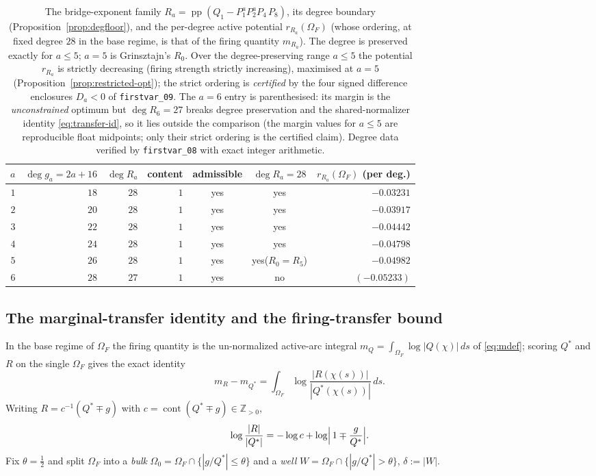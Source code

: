 \documentclass[11pt,reqno]{amsart}
\theoremstyle{plain}
\theoremstyle{definition}
\theoremstyle{remark}
\newcommand{\Z}{\mathbb{Z}}
\DeclareMathOperator{\pp}{pp}
\newcommand{\rb}[1]{r_{#1}}   %
\begin{document}
\begin{table}[ht]
\centering\small
\renewcommand{\arraystretch}{1.2}
\begin{tabular}{@{}rrrrccr@{}}
\toprule
$a$ & $\deg g_a=2a+16$ & $\deg R_a$ & content & admissible & $\deg R_a=28$ & $\rb{R_a}(\Omega_F)$ (per deg.)\\
\midrule
$1$ & $18$ & $28$ & $1$ & yes & yes & $-0.03231$\\
$2$ & $20$ & $28$ & $1$ & yes & yes & $-0.03917$\\
$3$ & $22$ & $28$ & $1$ & yes & yes & $-0.04442$\\
$4$ & $24$ & $28$ & $1$ & yes & yes & $-0.04798$\\
$5$ & $26$ & $28$ & $1$ & yes & yes\quad($R_0=R_5$) & $-0.04982$\\
$6$ & $28$ & $27$ & $1$ & yes & no & $(-0.05233)$\\
\bottomrule
\end{tabular}
\medskip
\caption{The bridge-exponent family $R_a=\pp(Q_1-P_1^aP_2^aP_4\,P_8)$, its degree
boundary (Proposition~\ref{prop:degfloor}), and the per-degree active potential
$\rb{R_a}(\Omega_F)$ (whose ordering, at fixed degree $28$ in the base regime, is that of
the firing quantity $m_{R_a}$). The degree is preserved exactly for $a\le5$; $a=5$ is
Grinsztajn's $R_0$. Over the degree-preserving range $a\le5$ the potential
$\rb{R_a}$ is strictly decreasing (firing strength strictly increasing),
maximised at $a=5$ (Proposition~\ref{prop:restricted-opt}); the strict ordering is
\emph{certified} by the four signed difference enclosures $D_a<0$ of
\texttt{firstvar\_09}. The $a=6$ entry is parenthesised: its margin is the
\emph{unconstrained} optimum but $\deg R_6=27$ breaks degree preservation and the
shared-normalizer identity \eqref{eq:transfer-id}, so it lies outside the comparison
(the margin values for $a\le5$ are reproducible float midpoints; only their strict
ordering is the certified claim). Degree data verified by \texttt{firstvar\_08} with
exact integer arithmetic.}
\label{tab:degfloor}
\end{table}

\subsection*{The marginal-transfer identity and the firing-transfer bound}
In the base regime of $\Omega_F$ the firing quantity is the un-normalized active-arc
integral $m_Q=\int_{\Omega_F}\log|Q(\chi)|\,ds$ of \eqref{eq:mdef}; scoring $Q^*$ and $R$
on the single $\Omega_F$ gives the exact identity
\begin{equation}\label{eq:transfer-id}
  m_R-m_{Q^*}=\int_{\Omega_F}\log\frac{|R(\chi(s))|}{|Q^*(\chi(s))|}\,ds .
\end{equation}
Writing $R=c^{-1}(Q^*\mp g)$ with $c=\operatorname{cont}(Q^*\mp g)\in\Z_{>0}$,
\[
  \log\frac{|R|}{|Q^*|}=-\log c+\log\Bigl|\,1\mp\frac{g}{Q^*}\Bigr| .
\]
Fix $\theta=\tfrac12$ and split $\Omega_F$ into a \emph{bulk}
$\Omega_0=\Omega_F\cap\{|g/Q^*|\le\theta\}$ and a \emph{well}
$W=\Omega_F\cap\{|g/Q^*|>\theta\}$, $\delta:=|W|$.
\end{document}
